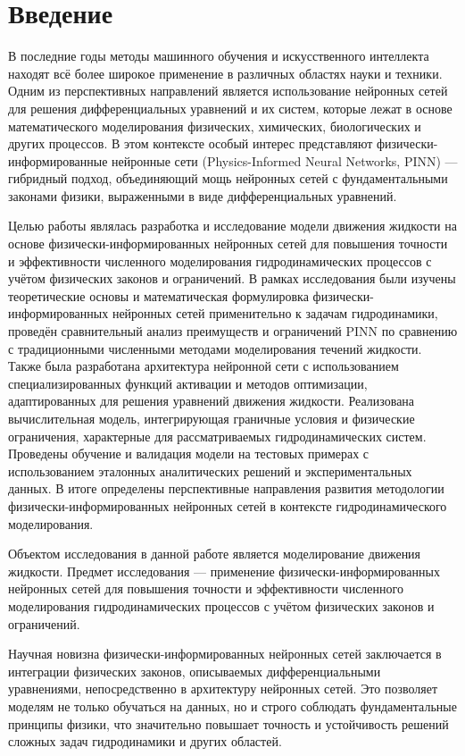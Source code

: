 \chapter*{Введение}

В последние годы методы машинного обучения и искусственного интеллекта находят всё
более широкое применение в различных областях науки и техники. Одним из перспективных
направлений является использование нейронных сетей для решения дифференциальных
уравнений и их систем, которые лежат в основе математического моделирования физических,
химических, биологических и других процессов. В этом контексте особый интерес представляют
физически-информированные нейронные сети (Physics-Informed Neural Networks, PINN) ---
гибридный подход, объединяющий мощь нейронных сетей с фундаментальными законами физики,
выраженными в виде дифференциальных уравнений.

Целью работы являлась разработка и исследование модели движения жидкости на основе
физически-информированных нейронных сетей для повышения точности и эффективности
численного моделирования гидродинамических процессов с учётом физических законов и
ограничений. В рамках исследования были изучены теоретические основы и математическая
формулировка физически-информированных нейронных сетей применительно к задачам
гидродинамики, проведён сравнительный анализ преимуществ и ограничений PINN по
сравнению с традиционными численными методами моделирования течений жидкости. Также
была разработана архитектура нейронной сети с использованием специализированных функций
активации и методов оптимизации, адаптированных для решения уравнений движения жидкости.
Реализована вычислительная модель, интегрирующая граничные условия и физические ограничения,
характерные для рассматриваемых гидродинамических систем. Проведены обучение и валидация
модели на тестовых примерах с использованием эталонных аналитических решений и
экспериментальных данных. В итоге определены перспективные направления развития
методологии физически-информированных нейронных сетей в контексте гидродинамического
моделирования.

Объектом исследования в данной работе является моделирование движения жидкости.
Предмет исследования — применение физически-информированных нейронных сетей
для повышения точности и эффективности численного моделирования гидродинамических
процессов с учётом физических законов и ограничений.

Научная новизна физически-информированных нейронных сетей заключается в интеграции
физических законов, описываемых дифференциальными уравнениями, непосредственно в
архитектуру нейронных сетей. Это позволяет моделям не только обучаться на данных,
но и строго соблюдать фундаментальные принципы физики, что значительно повышает
точность и устойчивость решений сложных задач гидродинамики и других областей.

